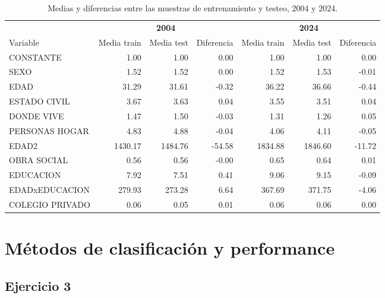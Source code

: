\documentclass[11pt,a4paper]{article}
\begin{document}
\begin{table}[H]
  \centering
  \caption{Medias y diferencias entre las muestras de entrenamiento y testeo, 2004 y 2024.}
  \label{tab:medias}
  \small
  \begin{tabular}{lrrrrrr}
    \toprule
    & \multicolumn{3}{c}{\textbf{2004}} & \multicolumn{3}{c}{\textbf{2024}} \\
    \cmidrule(lr){2-4}\cmidrule(lr){5-7}
    Variable & Media train & Media test & Diferencia & Media train & Media test & Diferencia \\
    \midrule
    CONSTANTE        &    1.00 &    1.00 &   0.00 &    1.00 &    1.00 &   0.00 \\
    SEXO             &    1.52 &    1.52 &   0.00 &    1.52 &    1.53 &  -0.01 \\
    EDAD             &   31.29 &   31.61 &  -0.32 &   36.22 &   36.66 &  -0.44 \\
    ESTADO CIVIL     &    3.67 &    3.63 &   0.04 &    3.55 &    3.51 &   0.04 \\
    DONDE VIVE       &    1.47 &    1.50 &  -0.03 &    1.31 &    1.26 &   0.05 \\
    PERSONAS HOGAR   &    4.83 &    4.88 &  -0.04 &    4.06 &    4.11 &  -0.05 \\
    EDAD2            & 1430.17 & 1484.76 & -54.58 & 1834.88 & 1846.60 & -11.72 \\
    OBRA SOCIAL      &    0.56 &    0.56 &  -0.00 &    0.65 &    0.64 &   0.01 \\
    EDUCACION        &    7.92 &    7.51 &   0.41 &    9.06 &    9.15 &  -0.09 \\
    EDADxEDUCACION   &  279.93 &  273.28 &   6.64 &  367.69 &  371.75 &  -4.06 \\
    COLEGIO PRIVADO  &    0.06 &    0.05 &   0.01 &    0.06 &    0.06 &   0.00 \\
    \bottomrule
  \end{tabular}
\end{table}

\section{Métodos de clasificación y performance}

\subsection*{Ejercicio 3}
\end{document}
